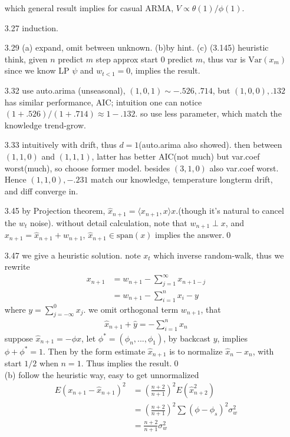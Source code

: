 \documentclass[paper=a4, fontsize=11pt]{scrartcl} %
\numberwithin{equation}{section} %
\numberwithin{figure}{section} %
\numberwithin{table}{section} %
\def \var {\text{Var}}
\begin{document}
\begin{itemize}
	which general result implies for casual ARMA, $V\propto \theta(1)/\phi(1)$.
	\item[3.27] induction.
	\item[3.29] (a) expand, omit between unknown. (b)by hint. (c) (3.145) heuristic think, given $n$ predict $m$ step approx start $0$ predict $m$, thus var is $\var(x_m)$ since we know LP $\psi$ and $w_{t<1}=0$, implies the result.
	\item[3.32] use auto.arima (unseasonal), $(1,0,1)\sim -.526, .714$, but $(1,0,0), .132$ has similar performance, AIC; intuition one can notice $(1+.526)/(1+.714)\approx 1-.132$. so use less parameter, which match the knowledge trend-grow.
	\item[3.33] intuitively with drift, thus $d=1$(auto.arima also showed). then between $(1,1,0)$ and $(1,1,1)$, latter has better AIC(not much) but var.coef worst(much), so choose former model. besides $(3,1,0)$ also var.coef worst. Hence $(1,1,0),-.231$ match our knowledge, temperature longterm drift, and diff converge in.
	\item[3.45] by Projection theorem, $\widehat{x}_{n+1}=\langle x_{n+1},x\rangle x$.(though it's natural to cancel the $w_t$ noise). without detail calculation, note that $w_{n+1} \perp x$, and $x_{n+1}=\widehat{x}_{n+1}+w_{n+1}$, $\widehat{x}_{n+1}\in \text{span}(x)$ implies the answer.\qed
	\item[3.47] we give a heuristic solution. note $x_t$ which inverse random-walk, thus we rewrite
	\begin{align}
		x_{n+1} &= w_{n+1} - \sum_{j=1}^{\infty}x_{n+1-j}\\
			&=  w_{n+1} - \sum_{i=1}^n x_{i} - y
	\end{align}
	where $y=\sum_{j=-\infty}^0 x_j$. we omit orthogonal term $w_{n+1}$, that
	\begin{align}
		\widehat{x}_{n+1} + \widehat{y} = - \sum_{i=1}^n x_n
	\end{align}
	suppose $\widehat{x}_{n+1}= -\phi x$, let $\phi^*=(\phi_n,...,\phi_1)$, by backcast $y$, implies $\phi+\phi^*=1$. Then by the form estimate $\widehat{x}_{n+1}$ is to normalize $\widehat{x}_n -x_n$, with start $1/2$ when $n=1$. Thus implies the result.\qed\\
	(b) follow the heuristic way, easy to get unnormalized
	\begin{align}
		E(x_{n+1}-\widehat{x}_{n+1})^2 &= (\frac{n+2}{n+1})^2 E(\widehat{x}_{n+2}^2)\\
			&= (\frac{n+2}{n+1})^2 \sum(\phi - \phi_s)^2\sigma_w^2\\
			&= \frac{n+2}{n+1}\sigma_w^2
	\end{align}
\end{itemize}
\end{document}
